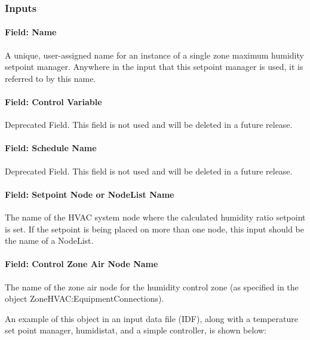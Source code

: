 \subsubsection{Inputs}\label{inputs-7-024}

\paragraph{Field: Name}\label{field-name-7-019}

A unique, user-assigned name for an instance of a single zone maximum humidity setpoint manager. Anywhere in the input that this setpoint manager is used, it is referred to by this name.

\paragraph{Field: Control Variable}\label{field-control-variable-7}

Deprecated Field. This field is not used and will be deleted in a future release.

\paragraph{Field: Schedule Name}\label{field-schedule-name-3-001}

Deprecated Field. This field is not used and will be deleted in a future release.

\paragraph{Field: Setpoint Node or NodeList Name}\label{field-setpoint-node-or-nodelist-name-7}

The name of the HVAC system node where the calculated humidity ratio setpoint is set. If the setpoint is being placed on more than one node, this input should be the name of a NodeList.

\paragraph{Field: Control Zone Air Node Name}\label{field-control-zone-air-node-name-1}

The name of the zone air node for the humidity control zone (as specified in the object ZoneHVAC:EquipmentConnections).

An example of this object in an input data file (IDF), along with a temperature set point manager, humidistat, and a simple controller, is shown below:

